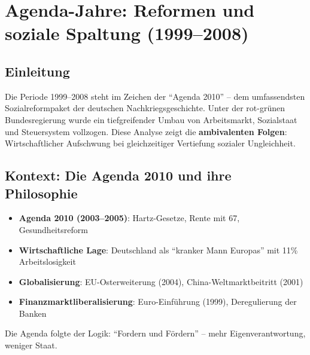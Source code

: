 \chapter{Agenda-Jahre: Reformen und soziale Spaltung (1999–2008)}
\label{chap:agenda_jahre}

\section*{Einleitung}
Die Periode 1999–2008 steht im Zeichen der \enquote{Agenda 2010} – dem umfassendsten Sozialreformpaket der deutschen Nachkriegsgeschichte. Unter
der rot-grünen Bundesregierung wurde ein tiefgreifender Umbau von Arbeitsmarkt, Sozialstaat und Steuersystem vollzogen. Diese Analyse zeigt die
\textbf{ambivalenten Folgen}: Wirtschaftlicher Aufschwung bei gleichzeitiger Vertiefung sozialer Ungleichheit.

\section{Kontext: Die Agenda 2010 und ihre Philosophie}

\begin{itemize}
    \item \textbf{Agenda 2010 (2003–2005)}: Hartz-Gesetze, Rente mit 67, Gesundheitsreform
    \item \textbf{Wirtschaftliche Lage}: Deutschland als \enquote{kranker Mann Europas} mit 11\% Arbeitslosigkeit
    \item \textbf{Globalisierung}: EU-Osterweiterung (2004), China-Weltmarktbeitritt (2001)
    \item \textbf{Finanzmarktliberalisierung}: Euro-Einführung (1999), Deregulierung der Banken
\end{itemize}

Die Agenda folgte der Logik: \enquote{Fordern und Fördern} – mehr Eigenverantwortung, weniger Staat.

